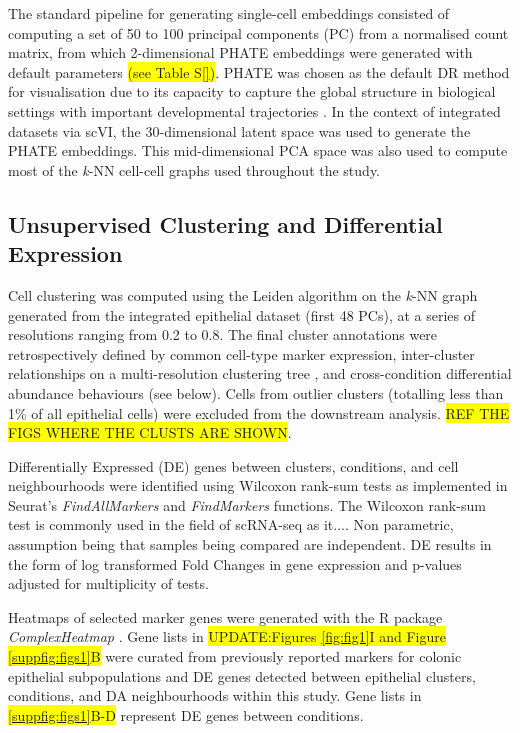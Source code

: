 The standard pipeline for generating single-cell embeddings consisted of computing a set of 50 to 100 principal components (PC) from a normalised count matrix, from which 2-dimensional PHATE embeddings were generated with default parameters \colorbox{yellow}{(see Table S\ref{})}. PHATE was chosen as the default DR method for visualisation due to its capacity to capture the global structure in biological settings with important developmental trajectories \cite{moon_visualizing_2019}. In the context of integrated datasets via scVI, the 30-dimensional latent space was used to generate the PHATE embeddings. 
This mid-dimensional PCA space was also used to compute most of the \emph{k}-NN cell-cell graphs used throughout the study. 


\subsection*{Unsupervised Clustering and Differential Expression}

Cell clustering was computed using the Leiden algorithm on the \emph{k}-NN graph generated from the integrated epithelial dataset (first 48 PCs), at a series of resolutions ranging from 0.2 to 0.8. The final cluster annotations were retrospectively defined by common cell-type marker expression, inter-cluster relationships on a multi-resolution clustering tree \cite{zappia_clustering_2018}, and cross-condition differential abundance behaviours (see below). Cells from outlier clusters (totalling less than 1\% of all epithelial cells) were excluded from the downstream analysis. \colorbox{yellow}{REF THE FIGS WHERE THE CLUSTS ARE SHOWN}.

Differentially Expressed (DE) genes between clusters, conditions, and cell neighbourhoods were identified using Wilcoxon rank-sum tests as implemented in Seurat's \textit{FindAllMarkers} and \textit{FindMarkers} functions. The Wilcoxon rank-sum test is commonly used in the field of scRNA-seq as it.... Non parametric, assumption being that samples being compared are independent. DE results in the form of log transformed Fold Changes in gene expression and p-values adjusted for multiplicity of tests.

Heatmaps of selected marker genes were generated with the R package \textit{ComplexHeatmap} \cite{gu_complex_2016}. Gene lists in \colorbox{yellow}{UPDATE:Figures \ref{fig:fig1}I and Figure \ref{suppfig:figs1}B} were curated from previously reported markers for colonic epithelial subpopulations and DE genes detected between epithelial clusters, conditions, and DA neighbourhoods within this study. Gene lists in \colorbox{yellow}{\ref{suppfig:figs1}B-D} represent DE genes between conditions.

